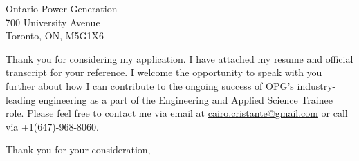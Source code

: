 \documentclass[11pt]{FDUletter}
\begin{document}
\begin{letter}{
    Ontario Power Generation \\
    700 University Avenue\\
    Toronto, ON, M5G1X6 \\
}




Thank you for considering my application. I have attached my resume and official transcript for your reference. I welcome the opportunity to speak with you further about how I can contribute to the ongoing success of OPG's industry-leading engineering as a part of the Engineering and Applied Science Trainee role. Please feel free to contact me via email at \href{mailto:cairo.cristante@gmail.com}{cairo.cristante@gmail.com} or call via +1(647)-968-8060.


\closing{Thank you for your consideration,}




% 
% 

\end{letter}
\end{document}
